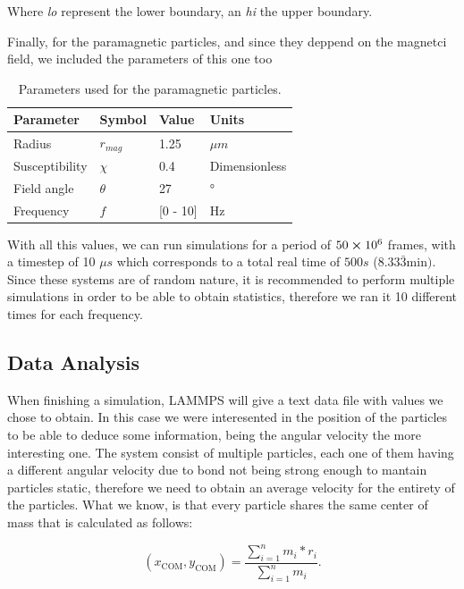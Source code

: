 Where \textit{lo} represent the lower boundary, an \textit{hi} the upper boundary.

Finally, for the paramagnetic particles, and since they deppend on the magnetci field, we included the parameters of this one too


\begin{table}[H]
\centering
\caption[Paramagnetic colloids parameters.]{Parameters used for the paramagnetic particles.}
\begin{tabular}{l l l l}
\hline
Parameter & Symbol  & Value & Units \\
\hline
Radius & $r_{mag}$ &  1.25 &\( \mu m\) \\
Susceptibility & $\chi$ & 0.4 & Dimensionless\\
Field angle & $\theta$ & 27 & °\\
Frequency & $f$ & [0 - 10] & Hz\\
\hline
\end{tabular}
\end{table}

With all this values, we can run simulations for a period of $50 \cross 10^6$ frames, with a timestep of 10 $\mu s$ which corresponds to a total real time of $500 s$ ($8.33\bar{3} \mathrm{min})$. Since these systems are of random nature, it is recommended to perform multiple simulations in order to be able to obtain statistics, therefore we ran it 10 different times for each frequency.

\subsection{Data Analysis}

When finishing a simulation, LAMMPS will give a text data file with values we chose to obtain. In this case we were interesented in the position of the particles to be able to deduce some information, being the angular velocity the more interesting one. The system consist of multiple particles, each one of them having a different angular velocity due to bond not being strong enough to mantain particles static, therefore we need to obtain an average velocity for the entirety of the particles. What we know, is that every particle shares the same center of mass that is calculated as follows:

\begin{equation}
  (x_{\mathrm{COM}}, y_{\mathrm{COM}}) = \displaystyle\frac{\sum^{n}_{i=1} m_i * r_i}{\sum^{n}_{i=1} m_i}.
  \label{eq:centerofmass}
\end{equation}

